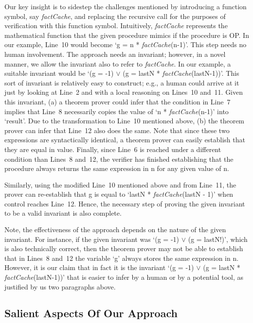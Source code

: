 Our key insight is to sidestep the challenges mentioned by introducing a
function symbol, say \emph{factCache}, and replacing the recursive call for the purposes
of verification with this function symbol. Intuitively, \emph{factCache} represents the
mathematical function that the given procedure mimics if the procedure is
OP.  In our example, Line~10 would become `g = n * \emph{factCache}(n-1)'. This step
needs no human involvement. The approach needs an invariant; however, in a
novel manner, we allow the invariant also to refer to \emph{factCache}. In our example,
a suitable invariant would be `(g = -1) $\vee$ (g = lastN *
\emph{factCache}(lastN-1))'. This sort of invariant is relatively easy to construct;
e.g., a human could arrive at it just by looking at Line~2 and with a local
reasoning on Lines~10 and~11. Given this invariant, (a) a theorem prover
could infer that the condition in Line~7 implies that Line~8 necessarily
copies the value of `n * \emph{factCache}(n-1)' into `result'. Due to the transformation to Line~10 mentioned above,
(b) the theorem prover can infer that Line~12 also does the same. Note that since these two expressions are syntactically
identical, a theorem prover can easily establish that they are equal in
value.  Finally, since Line~6 is reached under a different condition than
Lines~8 and~12, the verifier has finished establishing that the procedure
always returns the same expression in n for any given value of n.

Similarly, using the modified Line~10 mentioned above and from Line~11, the
prover can re-establish that g is equal to `lastN * \emph{factCache}(lastN - 1)' when
control reaches Line~12. Hence, the necessary step of proving the given
invariant to be a valid invariant is also complete. 

Note, the effectiveness of the approach depends on the nature of the given
invariant. For instance, if the given invariant was `(g = -1) $\vee$ (g =
lastN!)', which is also technically correct, then the theorem prover may
not be able to establish that in Lines~8 and~12 the variable `g' always
stores the same expression in n. However, it is our claim that in fact it is the
invariant `(g = -1) $\vee$ (g = lastN * \emph{factCache}(lastN-1))' that is
easier to infer by a human or by a potential tool, as justified by us two
paragraphs above.

\subsection{Salient Aspects Of Our Approach}

